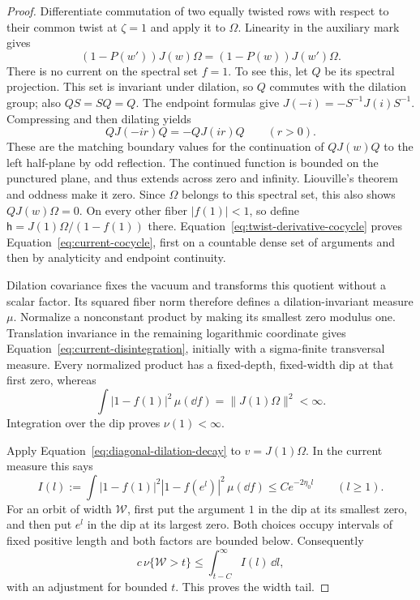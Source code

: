\begin{proof}
Differentiate commutation of two equally twisted rows with respect
to their common twist at $\zeta=1$ and apply it to $\Omega$.
Linearity in the auxiliary mark gives
\begin{equation}\label{eq:twist-derivative-cocycle}
 (1-P(w'))J(w)\Omega=(1-P(w))J(w')\Omega.
\end{equation}
There is no current on the spectral set $f=1$.  To see this, let $Q$
be its spectral projection.  This set is invariant under dilation,
so $Q$ commutes with the dilation group; also $QS=SQ=Q$.
The endpoint formulas give
$J(-i)=-S^{-1}J(i)S^{-1}$.  Compressing and then dilating yields
\[
 QJ(-ir)Q=-QJ(ir)Q\qquad(r>0).
\]
These are the matching boundary values for the continuation of
$QJ(w)Q$ to the left half-plane by odd reflection.
The continued function is bounded on the punctured plane, and thus
extends across zero and infinity.  Liouville's theorem and oddness
make it zero.  Since $\Omega$ belongs to this spectral set, this
also shows $QJ(w)\Omega=0$.  On every other fiber $|f(1)|<1$, so
define $\mathsf h=J(1)\Omega/(1-f(1))$ there.
Equation~\eqref{eq:twist-derivative-cocycle} proves
Equation~\eqref{eq:current-cocycle}, first on a countable dense set
of arguments and then by analyticity and endpoint continuity.

Dilation covariance fixes the vacuum and transforms this quotient
without a scalar factor.  Its squared fiber norm therefore defines
a dilation-invariant measure $\mu$.  Normalize a nonconstant product
by making its smallest zero modulus one.  Translation invariance in
the remaining logarithmic coordinate gives
Equation~\eqref{eq:current-disintegration}, initially with a
sigma-finite transversal measure.  Every normalized product has a
fixed-depth, fixed-width dip at that first zero, whereas
\[
 \int |1-f(1)|^2\,\mu(\dd f)=\|J(1)\Omega\|^2<\infty.
\]
Integration over the dip proves $\nu(1)<\infty$.

Apply Equation~\eqref{eq:diagonal-dilation-decay} to
$v=J(1)\Omega$.  In the current measure this says
\[
 I(l):=\int |1-f(1)|^2|1-f(e^l)|^2\,\mu(\dd f)
 \le C e^{-2\eta_0l}\qquad(l\ge1).
\]
For an orbit of width $\mathcal W$, first put the argument $1$ in
the dip at its smallest zero, and then put $e^l$ in the dip at its
largest zero.  Both choices occupy intervals of fixed positive
length and both factors are bounded below.  Consequently
\[
 c\,\nu\{\mathcal W>t\}
 \le\int_{t-C}^{\infty}I(l)\,\dd l,
\]
with an adjustment for bounded $t$.  This proves the width tail.


\end{proof}
